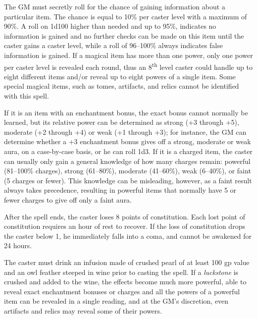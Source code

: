 \begin{multicols}{2}
The GM must secretly roll for the chance of gaining information about a particular item.  The chance is equal to 10\% per caster level with a maximum of 90\%.  A roll on 1d100 higher than needed and up to 95\%, indicates no information is gained and no further checks can be made on this item until the caster gains a caster level, while a roll of 96--100\% always indicates false information is gained.  If a magical item has more than one power, only one power per caster level is revealed each round, thus an 8\textsuperscript{th} level caster could handle up to eight different items and/or reveal up to eight powers of a single item.  Some special magical items, such as tomes, artifacts, and relics cannot be identified with this spell.

If it is an item with an enchantment bonus, the exact bonus cannot normally be learned, but its relative power can be determined as strong (+3 through +5), moderate (+2 through +4) or weak (+1 through  +3); for instance, the GM can determine whether a +3 enchantment bonus gives off a strong, moderate or weak aura, on a case-by-case basis, or he can roll 1d3.  If it is a charged item, the caster can usually only gain a general knowledge of how many charges remain: powerful (81--100\% charges), strong (61--80\%), moderate (41--60\%), weak (6--40\%), or faint (5 charges or fewer).  This knowledge can be misleading, however, as a faint result always takes precedence, resulting in powerful items that normally have 5 or fewer charges to give off only a faint aura.

After the spell ends, the caster loses 8 points of constitution.  Each lost point of constitution requires an hour of rest to recover.  If the loss of constitution drops the caster below 1, he immediately falls into a coma, and cannot be awakened for 24 hours.
 
The caster must drink an infusion made of crushed pearl of at least 100 gp value and an owl feather steeped in wine prior to casting the spell.  If a \textit{luckstone} is crushed and added to the wine, the effects become much more powerful, able to reveal exact enchantment bonuses or charges and all the powers of a powerful item can be revealed in a single reading, and at the GM's discretion, even artifacts and relics may reveal some of their powers.

\vspace{1em}

\noindent
\begin{minipage}{\columnwidth}


\end{minipage}
\end{multicols}
